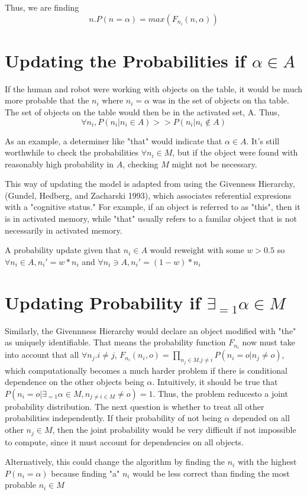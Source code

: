 \documentclass{article}
\begin{document}
Thus, we are finding
$$n. P(n= \alpha) = max(F_{n_i}(n, \alpha) )$$

\section{Updating the Probabilities if  $\alpha \in A$}
If the human and robot were working with objects on the table, it would be much more probable that the $n_i$ where $n_i = \alpha$ was in the set of objects on tha table. The set of objects on the table would then be in the activated set, A. Thus, 
$$\forall n_i, P(n_i | n_i \in A) >> P(n_i | n_i \notin A)$$

As an example, a determiner like "that" would indicate that $\alpha \in A$. It's still worthwhile to check the probabilities $\forall n_i \in M$, but if the object were found with reasonably high probability in $A$, checking $M$ might not be necessary.

This way of updating the model is adapted from using the Givenness Hierarchy, (Gundel, Hedberg, and Zacharski 1993), which associates referential expresions with a "cognitive status." For example, if an object is referred to as "this", then it is in activated memory, while "that" usually refers to a familar object that is not necessarily in activated memory. 

A probability update given that $n_i \in A$ would reweight with some $w > 0.5$ so $\forall n_i \in A, n_i' = w* n_i $ and $\forall n_i \ni A, n_i' = (1-w)* n_i $ 


\section{Updating Probability if $\exists_{=1} \alpha \in M$} 
Similarly, the Givennness Hierarchy would declare an object modified with "the" as uniquely identifiable. That means the probability function $F_{n_i}$ now must take into account that all $\forall n_j . i \neq j$, 
$F_{n_i}(n_i, o) = \prod\limits_{n_j \in M . j \neq i} P( n_i = o | n_j \neq o) $, which computationally becomes a much harder problem if there is conditional dependence on the other objects being $ \alpha$. Intuitively, it should be true that $P(n_i = o| \exists_{=1} \alpha \in M, n_{j \neq i \in M} \neq o) =1$. Thus, the problem reducesto a joint probability distribution. The next question is whether to treat all other probabilities independently. If their probability of not being $\alpha$ depended on all other $n_j \in M$, then the joint probability would be very difficult if not impossible to compute, since it must account for dependencies on all objects.  
 
Alternatively, this could change the algorithm by finding the $n_i$ with the highest $P(n_i = \alpha)$ because finding "a" $n_i$ would be less correct than finding the most probable $n_i \in M$
\end{document}

